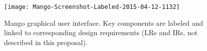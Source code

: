%
%
%

\begin{figure}[tbh] %
   \centering
   \texttt{[image: Mango-Screenshot-Labeled-2015-04-12-1132]} 
   \caption{Mango graphical user interface. Key components are labeled and linked to corresponding design requirements (LRs and IRs, not described in this proposal).}
   \label{fig:implementation:screenshot}
\end{figure}




